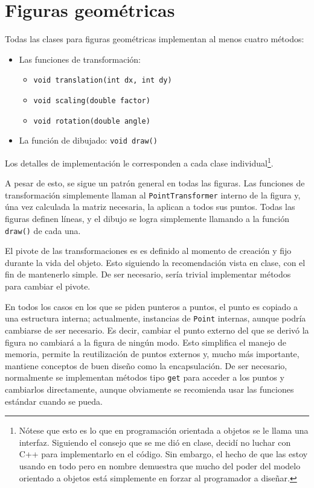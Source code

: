\section{Figuras geométricas}
\label{figuras_geometricas}

Todas las clases para figuras geométricas implementan al menos cuatro métodos:
\begin{itemize}
	\item Las funciones de transformación:
	\begin{itemize}
		\item \lstinline!void translation(int dx, int dy)!
		\item \lstinline!void scaling(double factor)!
		\item \lstinline!void rotation(double angle)!
	\end{itemize}
	\item La función de dibujado: \lstinline!void draw()!
\end{itemize}

Los detalles de implementación le corresponden a cada clase individual\footnote{Nótese
que esto es lo que en programación orientada a objetos se le llama una interfaz. Siguiendo
el consejo que se me dió en clase, decidí no luchar con C++ para implementarlo en el
código. Sin embargo, el hecho de que las estoy usando en todo pero en nombre demuestra
que mucho del poder del modelo orientado a objetos está simplemente en forzar al programador
a diseñar.}.

A pesar de esto, se sigue un patrón general en todas las figuras. Las funciones de
transformación simplemente llaman al \lstinline!PointTransformer! interno de la figura
y, úna vez calculada la matriz necesaria, la aplican a todos sus puntos. Todas las
figuras definen líneas, y el dibujo se logra simplemente llamando a la función
\lstinline!draw()! de cada una.

El pivote de las transformaciones es es definido al momento de creación y
fijo durante la vida del objeto. Esto siguiendo la recomendación vista en clase,
con el fin de mantenerlo simple. De ser necesario, sería trivial implementar métodos
para cambiar el pivote.

En todos los casos en los que se piden punteros a puntos, el punto es copiado a
una estructura interna; actualmente, instancias de \lstinline!Point! internas, aunque
podría cambiarse de ser necesario. Es decir, cambiar el punto externo del que se derivó
la figura no cambiará a la figura de ningún modo. Esto simplifica el manejo de memoria,
permite la reutilización de puntos externos y, mucho más importante, mantiene conceptos
de buen diseño como la encapsulación. De ser necesario, normalmente se implementan
métodos tipo \lstinline!get! para acceder a los puntos y cambiarlos directamente,
aunque obviamente se recomienda usar las funciones estándar cuando se pueda.

